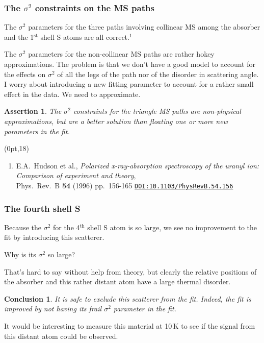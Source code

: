 \documentclass[10pt, xcolor=x11names, compress, handout]{beamer}
\newtheorem{conclusion}[theorem]{Conclusion}
\newtheorem{assertion}[theorem]{Assertion}
\begin{document}
\begin{frame}
  \frametitle{The $\sigma^2$ constraints on the MS paths}
  The $\sigma^2$ parameters for the three paths involving collinear MS
  among the absorber and the 1$^{\mathrm{st}}$ shell S atoms are all
  correct.$^1$

  \bigskip

  The $\sigma^2$ parameters for the non-collinear MS paths are rather
  hokey approximations.  The problem is that we don't have a good
  model to account for the effects on $\sigma^2$ of all the legs of
  the path nor of the disorder in scattering angle.  I worry about
  introducing a new fitting parameter to account for a rather small
  effect in the data.  We need to approximate.

  \begin{assertion}
    The $\sigma^2$ constraints for the triangle MS paths are
    non-physical approximations, but are a better solution than
    floating one or more new parameters in the fit.
  \end{assertion}

  \begin{textblock*}{0.9\linewidth}(0pt,18\TPVertModule)%
    \begin{enumerate}[1.]
    \tiny
  \item E.A.\ Hudson et al., \textit{Polarized x-ray-absorption
      spectroscopy of the uranyl ion: Comparison of experiment and
      theory},\\ Phys.\ Rev.\ B \textbf{54} (1996) pp.\ 156-165
    \href{http://dx.doi.org/10.1103/PhysRevB.54.156}
    {\color{Blue4}\texttt{DOI:10.1103/PhysRevB.54.156}}
  \end{enumerate}
\end{textblock*}
\end{frame}

\begin{frame}
  \frametitle{The fourth shell S}
  Because the $\sigma^2$ for the 4$^{\mathrm{th}}$ shell S atom is so
  large, we see no improvement to the fit by introducing this
  scatterer.  

  \begin{center}
    Why is its $\sigma^2$ so large?
  \end{center}

  That's hard to say without help from theory, but clearly the
  relative positions of the absorber and this rather distant atom have
  a large thermal disorder.

  \begin{conclusion}
    It is safe to exclude this scatterer from the fit.  Indeed, the
    fit is improved by not having its frail $\sigma^2$ parameter in
    the fit.
  \end{conclusion}

  It would be interesting to measure this material at 10\,K to see if
  the signal from this distant atom could be observed.
\end{frame}
\end{document}

